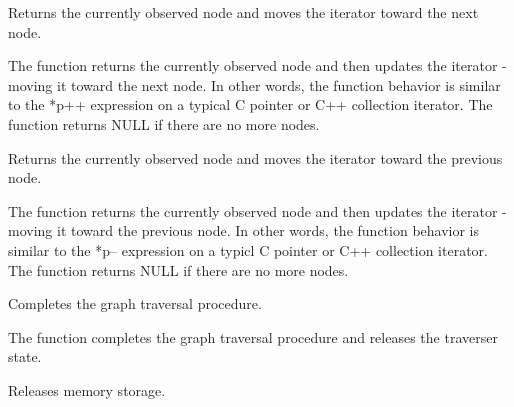 
Returns the currently observed node and moves the iterator toward the next node.


\begin{description}
\end{description}


The function returns the currently observed node and then updates the iterator - moving it toward the next node. In other words, the function behavior is similar to the *p++ expression on a typical C pointer or C++ collection iterator. The function returns NULL if there are no more nodes.



Returns the currently observed node and moves the iterator toward the previous node.


\begin{description}
\end{description}


The function returns the currently observed node and then updates the iterator - moving it toward the previous node. In other words, the function behavior is similar to the *p-- expression on a typicl C pointer or C++ collection iterator. The function returns NULL if there are no more nodes.


Completes the graph traversal procedure.


\begin{description}
\end{description}


The function completes the graph traversal procedure and releases the traverser state.



Releases memory storage.


